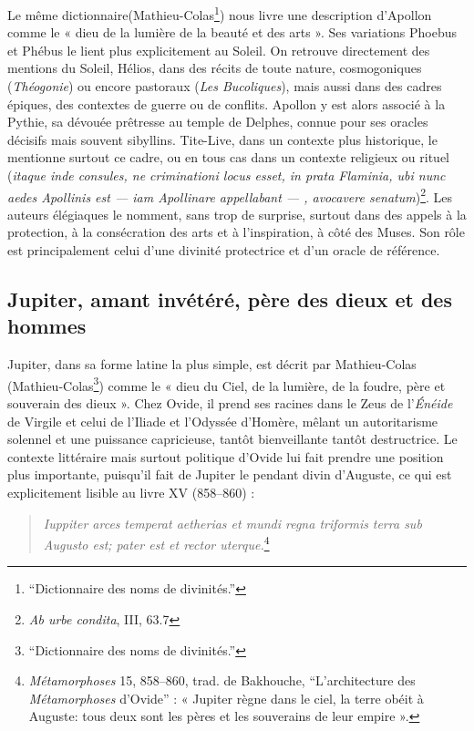 \documentclass[
  letterpaper,
  DIV=11,
  numbers=noendperiod]{scrreprt}
\begin{document}
Le même dictionnaire(Mathieu-Colas\footnote{{``Dictionnaire des noms de
  divinités.''}}) nous livre une description d'Apollon comme le « dieu
de la lumière de la beauté et des arts ». Ses variations Phoebus et
Phébus le lient plus explicitement au Soleil. On retrouve directement
des mentions du Soleil, Hélios, dans des récits de toute nature,
cosmogoniques (\emph{Théogonie}) ou encore pastoraux (\emph{Les
Bucoliques}), mais aussi dans des cadres épiques, des contextes de
guerre ou de conflits. Apollon y est alors associé à la Pythie, sa
dévouée prêtresse au temple de Delphes, connue pour ses oracles décisifs
mais souvent sibyllins. Tite-Live, dans un contexte plus historique, le
mentionne surtout ce cadre, ou en tous cas dans un contexte religieux ou
rituel (\emph{itaque inde consules, ne criminationi locus esset, in
prata Flaminia, ubi nunc aedes Apollinis est --- iam Apollinare
appellabant --- , avocavere senatum})\footnote{\emph{Ab urbe condita},
  III, 63.7}. Les auteurs élégiaques le nomment, sans trop de surprise,
surtout dans des appels à la protection, à la consécration des arts et à
l'inspiration, à côté des Muses. Son rôle est principalement celui d'une
divinité protectrice et d'un oracle de référence.

\subsection{Jupiter, amant invétéré, père des dieux et des
hommes}\label{jupiter-amant-invuxe9tuxe9ruxe9-puxe8re-des-dieux-et-des-hommes}

Jupiter, dans sa forme latine la plus simple, est décrit par
Mathieu-Colas (Mathieu-Colas\footnote{{``Dictionnaire des noms de
  divinités.''}}) comme le « dieu du Ciel, de la lumière, de la foudre,
père et souverain des dieux ». Chez Ovide, il prend ses racines dans le
Zeus de l'\emph{Énéide} de Virgile et celui de l'Iliade et l'Odyssée
d'Homère, mêlant un autoritarisme solennel et une puissance capricieuse,
tantôt bienveillante tantôt destructrice. Le contexte littéraire mais
surtout politique d'Ovide lui fait prendre une position plus importante,
puisqu'il fait de Jupiter le pendant divin d'Auguste, ce qui est
explicitement lisible au livre XV (858--860) :

\begin{quote}
\emph{Iuppiter arces} \emph{temperat aetherias et mundi regna triformis}
\emph{terra sub Augusto est; pater est et rector uterque.}\footnote{\emph{Métamorphoses}
  15, 858--860, trad. de Bakhouche, {``L'architecture des
  \emph{Métamorphoses} d'Ovide''} : « Jupiter règne dans le ciel, la
  terre obéit à Auguste: tous deux sont les pères et les souverains de
  leur empire ».}
\end{quote}
\end{document}
